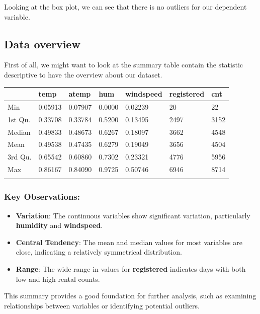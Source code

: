 Looking at the box plot, we can see that there is no outliers for our dependent variable.

\subsection{Data overview}
First of all, we might want to look at the summary table contain the statistic descriptive to have the overview about our dataset.

\begin{table}[ht]
\centering
\begin{tabular}{lllllll}
  \hline
         &      temp &     atemp &      hum &   windspeed &   registered &      cnt \\ 
  \hline
      Min& 0.05913& 0.07907& 0.0000& 0.02239& 20& 22\\ 
        1st Qu.& 0.33708& 0.33784& 0.5200& 0.13495& 2497& 3152\\ 
          Median& 0.49833& 0.48673& 0.6267& 0.18097& 3662& 4548\\ 
          Mean& 0.49538& 0.47435& 0.6279& 0.19049& 3656& 4504\\ 
           3rd Qu.& 0.65542& 0.60860& 0.7302& 0.23321& 4776& 5956\\ 
           Max& 0.86167& 0.84090& 0.9725& 0.50746& 6946& 8714\\ 
            &  &  &  &  &  &  \\ 
   \hline
\end{tabular}
\end{table}


\subsubsection{Key Observations:}

\begin{itemize}
    \item \textbf{Variation}: The continuous variables show significant variation, particularly \textbf{humidity} and \textbf{windspeed}.
    \item \textbf{Central Tendency}: The mean and median values for most variables are close, indicating a relatively symmetrical distribution.
    \item \textbf{Range}: The wide range in values for \textbf{registered} indicates days with both low and high rental counts.
\end{itemize}
This summary provides a good foundation for further analysis, such as examining relationships between variables or identifying potential outliers.


